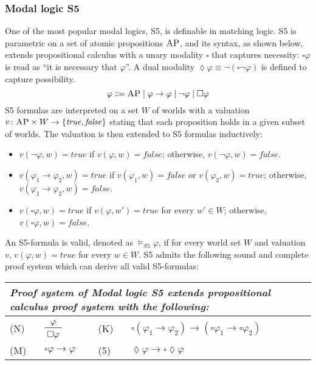 \documentclass[letter,12pt]{article}
\newcommand{\imp}{\to}
\newcommand{\prule}[1]{\textsc{(#1)}}
\newcommand{\AP}{\textsc{AP}}
\newcommand{\true}{\mathit{true}}
\newcommand{\false}{\mathit{false}}
\newcommand{\always}{{\square}}
\newcommand{\eventually}{{\lozenge}}
\begin{document}
\subsubsection{Modal logic S5}
\label{sec_modal_logic_S5}
One of the most popular modal logics, S5, is definable in 
matching logic.
S5 is parametric on a set of atomic propositions $\AP$,
and 
its syntax, as shown below, extends propositional calculus with a unary modality
$\always$ that captures necessity:
$\always \varphi$ is read as ``it is necessary that $\varphi$''.
A dual modality $\eventually \varphi \equiv \neg (\always \neg \varphi)$
is defined to capture possibility.
\begin{equation*}
\varphi \Coloneqq
\AP \mid \varphi \imp \varphi
\mid \neg \varphi
\mid \always \varphi
\end{equation*}
S5 formulas are interpreted on a set $W$ of worlds
with a valuation $v \colon \AP \times W \to \{ \true, \false \}$
stating that each proposition holds in a given subset of worlds.
The valuation is then extended to S5 formulas inductively:
\begin{itemize}
\item $v(\neg \varphi, w) = \true$ if $v(\varphi, w) = \false$;
      otherwise,
      $v(\neg \varphi, w) = \false$.
\item $v(\varphi_1 \imp \varphi_2, w) = \true$
      if $v(\varphi_1, w) = \false$ or $v(\varphi_2, w) = \true$;
      otherwise,
      $v(\varphi_1 \imp \varphi_2, w) = \false$.
\item $v(\always \varphi, w) = \true$ if
      $v(\varphi, w') = \true$ for every $w' \in W$;
      otherwise,
      $v(\always \varphi, w) = \false$.
\end{itemize}
An S5-formula is valid, denoted as $\vDash_{S5} \varphi$, if for every 
world set $W$ and valuation $v$,
$v(\varphi, w) = \true$ for every $w \in W$.
S5 admits the following sound and complete proof system
which can derive all valid S5-formulas:
\begin{center}
\begin{tabular}{lm{5cm}ll}
\multicolumn{4}{l}{
\em 
Proof system of Modal logic S5 
extends propositional calculus proof system with the following:
}
\\\hline
\prule{N}
&
$\prftree{\varphi}{\always \varphi}$
&
\prule{K}
&
$\always(\varphi_1 \imp \varphi_2) 
 \imp (\always \varphi_1 \imp \always \varphi_2)$
\\
\prule{M}
&
$\always \varphi \imp \varphi$
&
\prule{5}
&
$\eventually \varphi \imp \always \eventually \varphi$
\end{tabular}
\end{center}
\end{document}
